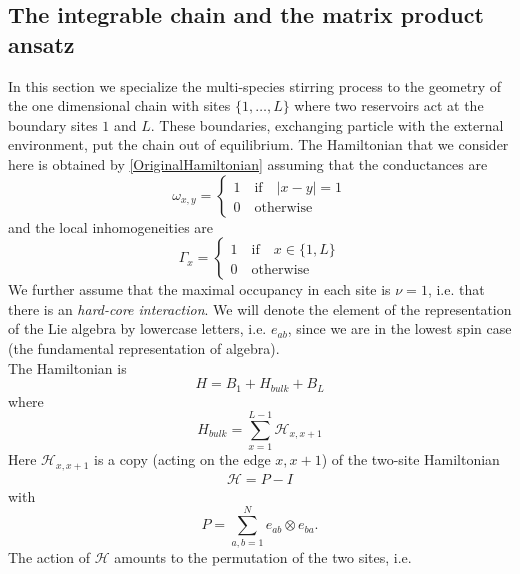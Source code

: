 \documentclass[11pt]{article}
\numberwithin{equation}{section}
\numberwithin{equation}{subsection}
\newcommand{\id}{I}
\begin{document}
\subsection{The integrable chain and the matrix product ansatz}
In this section we specialize the multi-species stirring process to the geometry of the one dimensional chain with sites $\{1,\ldots,L\}$ where two reservoirs act at the boundary sites $1$ and $L$. These boundaries, exchanging particle with the external environment, put the chain out of equilibrium. The Hamiltonian that we consider here is obtained by \eqref{OriginalHamiltonian} assuming that the conductances are
\begin{equation}
    \omega_{x,y}=\begin{cases}
    1 \quad \text{if}\quad |x-y|=1\\
    0\quad \text{otherwise}
    \end{cases}
\end{equation}
and the local inhomogeneities are
\begin{equation}
    \Gamma_{x}=\begin{cases}
        1\quad \text{if} \quad x\in \{1,L\}\\
        0\quad \text{otherwise}
    \end{cases}
    \end{equation}
We further assume that the maximal occupancy in each site is $\nu=1$, i.e. that there is an \textit{hard-core interaction}.
{\color{red} We will denote the element of the representation of the Lie algebra by lowercase letters, i.e. $e_{ab}$, since we are in the lowest spin case (the fundamental representation of algebra).} \\
The Hamiltonian is
\begin{equation}\label{hamiltonian}
	H=B_{1}+H_{bulk}+B_{L}
\end{equation}
where
\begin{equation}
    H_{bulk}=\sum_{x=1}^{L-1}\mathcal{H}_{x,x+1}
\end{equation}
Here $\mathcal{H}_{x,x+1}$  is a copy (acting on the edge $x,x+1$) of the two-site Hamiltonian
\begin{equation}
	\begin{split}
		\mathcal{H}=P-\id
	\end{split}
\end{equation}
with 
\begin{equation}
	P=\sum_{a,b=1}^Ne_{ab}\otimes e_{ba}.
\end{equation} 
The action of $\mathcal{H}$ amounts to the permutation of the two sites, i.e.
\end{document}
